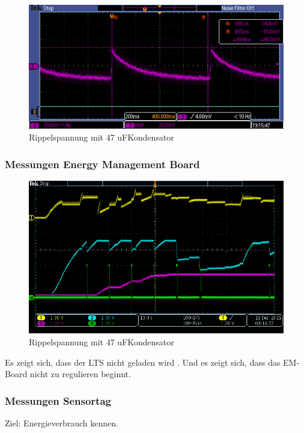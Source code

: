\begin{figure}
\includegraphics[bb = 0 0 100 100]{3Vorgehen/imag/47uF.PNG}
\caption{Rippelspannung mit 47 uFKondensator}
\end{figure}


\subsubsection{Messungen Energy Management Board}

\begin{figure}
\includegraphics[bb = 0 0 100 100]{3Vorgehen/imag/messungPA.png}
\caption{Rippelspannung mit 47 uFKondensator}
\end{figure}
Es zeigt sich, dass der LTS nicht geladen wird . Und es zeigt sich, dass das EM-Board nicht zu regulieren beginnt.








\pagebreak
\subsubsection{Messungen Sensortag}
Ziel: Energieverbrauch kennen.

